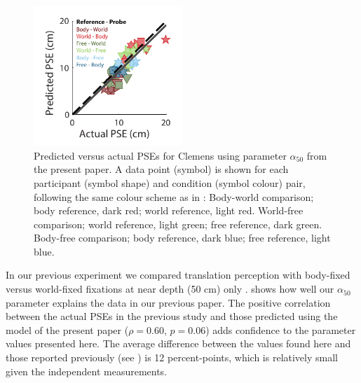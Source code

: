 \begin{figure}
    \includegraphics[width=0.5\textwidth]{src/paper4/p4_figure6.pdf}

    \caption{Predicted versus actual PSEs for Clemens \protect\citeyear{clemens2015a} using parameter $\alpha_{50}$ from the present paper. A data point (symbol) is shown for each participant (symbol shape) and condition (symbol colour) pair, following the same colour scheme as in \protect{}: Body-world comparison; body reference, dark red; world reference, light red. World-free comparison; world reference, light green; free reference, dark green. Body-free comparison; body reference, dark blue; free reference, light blue.}
    \label{p4:fig6}
\end{figure}

In our previous experiment we compared translation perception with body-fixed versus world-fixed fixations at near depth (50 \si{\centi\metre}) only \cite{clemens2015a}.  shows how well our $\alpha_{50}$ parameter explains the data in our previous paper. The positive correlation between the actual PSEs in the previous study and those predicted using the model of the present paper ($\rho = 0.60$, $p = 0.06$) adds confidence to the parameter values presented here. The average difference between the values found here and those reported previously (see ) is 12  percent-points, which is relatively small given the independent measurements.


